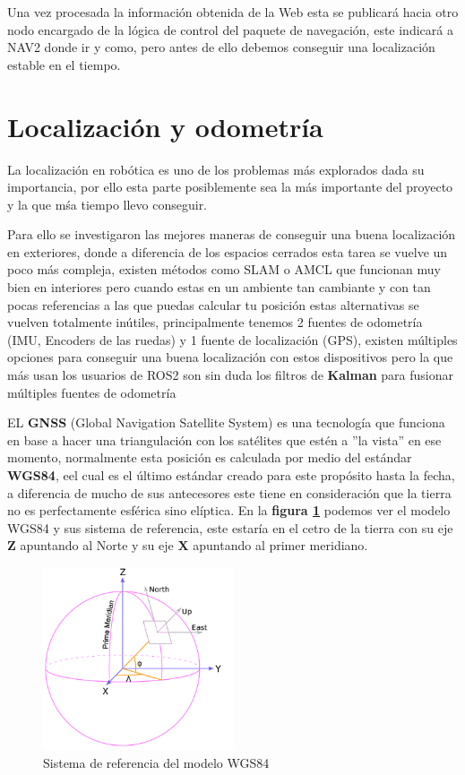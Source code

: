 Una vez procesada la información obtenida de la Web esta se publicará hacia otro nodo encargado de la lógica de control del paquete de 
navegación, este indicará a NAV2 donde ir y como, pero antes de ello debemos conseguir una localización estable en el tiempo.

\section{Localización y odometría}

La localización en robótica es uno de los problemas más explorados dada su importancia, por ello esta parte posiblemente sea la más 
importante del proyecto y la que mśa tiempo llevo conseguir.

Para ello se investigaron las mejores maneras de conseguir una buena localización en exteriores, donde a diferencia de los espacios cerrados 
esta tarea se vuelve un poco más compleja, existen métodos como SLAM o AMCL que funcionan muy bien en interiores pero cuando estas en un 
ambiente tan cambiante y con tan pocas referencias a las que puedas calcular tu posición estas alternativas se vuelven totalmente 
inútiles, principalmente tenemos 2 fuentes de odometría (IMU, Encoders de las ruedas) y 1 fuente de localización (GPS), existen múltiples 
opciones para conseguir una buena localización con estos dispositivos 
pero la que más usan los usuarios de ROS2 son sin duda los filtros de \textbf{Kalman} para fusionar múltiples fuentes de odometría 
 
EL \textbf{GNSS} (Global Navigation Satellite System) es una tecnología que funciona en base a hacer una triangulación con los satélites que 
estén a ''la vista'' en ese momento, normalmente esta 
posición es calculada por medio del estándar \textbf{WGS84}, eel cual es el último estándar creado para este propósito hasta la fecha, a 
diferencia de mucho de sus antecesores este tiene en consideración 
que la tierra no es perfectamente esférica sino elíptica. En la \textbf{figura \ref{fig:wgs84}} podemos ver el modelo WGS84 y sus sistema 
de referencia, este estaría en el cetro de la tierra 
con su eje \textbf{Z} apuntando al Norte y su eje \textbf{X} apuntando al primer meridiano.

\begin{figure}[h]
    \centering
    \includegraphics[width=0.5\textwidth]{images/wgs84.png}
    \caption{Sistema de referencia del modelo WGS84}
    \label{fig:wgs84}
\end{figure}

